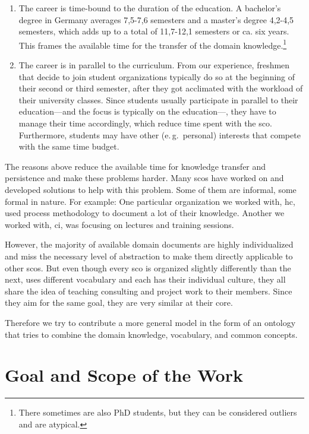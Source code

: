 \documentclass[a4paper, DIV=13, BCOR=0cm]{scrbook}
\newcommand{\eg}{e.\,g.\ }
\begin{document}
\begin{enumerate}
	\item The career is time-bound to the duration of the education. A bachelor's degree in Germany averages 7,5-7,6 semesters and a master's degree 4,2-4,5 semesters, which adds up to a total of 11,7-12,1 semesters or ca. six years. \cite{stabu2019a} This frames the available time for the transfer of the domain knowledge.\footnote{There sometimes are also PhD students, but they can be considered outliers and are atypical.}
	\item The career is in parallel to the curriculum. From our experience, freshmen that decide to join student organizations typically do so at the beginning of their second or third semester, after they got acclimated with the workload of their university classes. Since students usually participate in parallel to their education---and the focus is typically on the education---, they have to manage their time accordingly, which reduce time spent with the \gls{sco}. Furthermore, students may have other (\eg personal) interests that compete with the same time budget.
\end{enumerate}

The reasons above reduce the available time for knowledge transfer and persistence and make these problems harder. Many \glspl{sco} have worked on and developed solutions to help with this problem. Some of them are informal, some formal in nature. For example: One particular organization we worked with, \gls{hc}, used process methodology to document a lot of their knowledge. Another we worked with, \gls{ci}, was focusing on lectures and training sessions.

However, the majority of available domain documents are highly individualized and miss the necessary level of abstraction to make them directly applicable to other \glspl{sco}. But even though every \gls{sco} is organized slightly differently than the next, uses different vocabulary and each has their individual culture, they all share the idea of teaching consulting and project work to their members. Since they aim for the same goal, they are very similar at their core.

Therefore we try to contribute a more general model in the form of an ontology that tries to combine the domain knowledge, vocabulary, and common concepts.

\section{Goal and Scope of the Work }
\label{goal}
\end{document}

